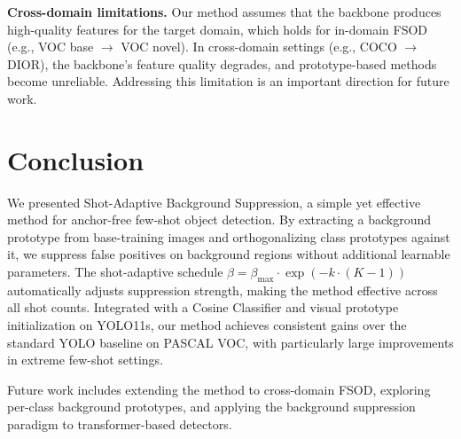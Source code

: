 \documentclass[10pt,twocolumn,letterpaper]{article}
\begin{document}
\textbf{Cross-domain limitations.}
Our method assumes that the backbone produces high-quality features for the target
domain, which holds for in-domain FSOD (e.g., VOC base $\rightarrow$ VOC novel).
In cross-domain settings (e.g., COCO $\rightarrow$ DIOR), the backbone's feature quality
degrades, and prototype-based methods become unreliable. Addressing this limitation
is an important direction for future work.

\section{Conclusion}
\label{sec:conclusion}

We presented Shot-Adaptive Background Suppression, a simple yet effective method
for anchor-free few-shot object detection. By extracting a background prototype
from base-training images and orthogonalizing class prototypes against it,
we suppress false positives on background regions without additional learnable
parameters. The shot-adaptive schedule $\beta = \beta_{\max} \cdot \exp(-k \cdot (K-1))$
automatically adjusts suppression strength, making the method effective across all
shot counts. Integrated with a Cosine Classifier and visual prototype initialization
on YOLO11s, our method achieves consistent gains over the standard YOLO baseline
on PASCAL VOC, with particularly large improvements in extreme few-shot settings.

Future work includes extending the method to cross-domain FSOD,
exploring per-class background prototypes, and applying the background suppression
paradigm to transformer-based detectors.

{\small


}
\end{document}
